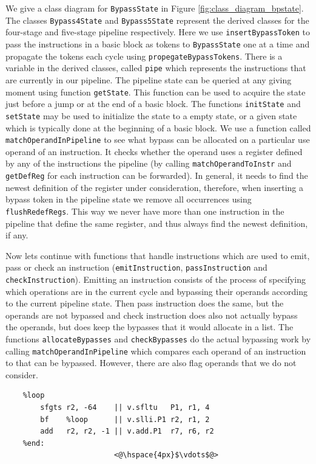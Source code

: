 We give a class diagram for \texttt{BypassState} in Figure \ref{fig:class_diagram_bpstate}. The classes  \texttt{Bypass4State} and \texttt{Bypass5State} represent the derived classes for the four-stage and five-stage pipeline respectively. Here we use \texttt{insertBypassToken} to pass the instructions in a basic block as tokens to \texttt{BypassState} one at a time and propagate the tokens each cycle using \texttt{propegateBypassTokens}. There is a variable in the derived classes, called \texttt{pipe} which represents the instructions that are currently in our pipeline. The pipeline state can be queried at any giving moment using function \texttt{getState}. This function can be used to acquire the state just before a jump or at the end of a basic block. The functions \texttt{initState} and \texttt{setState} may be used to initialize the state to a empty state, or a given state which is typically done at the beginning of a basic block. We use a function called \texttt{matchOperandInPipeline} to see what bypass can be allocated on a particular use operand of an instruction. It checks whether the operand uses a register defined by any of the instructions the pipeline (by calling \texttt{matchOperandToInstr} and \texttt{getDefReg} for each instruction can be forwarded). In general, it needs to find the newest definition of the register under consideration, therefore, when inserting a bypass token in the pipeline state we remove all occurrences using \texttt{flushRedefRegs}. This way we never have more than one instruction in the pipeline that define the same register, and thus always find the newest definition, if any.

Now lets continue with functions that handle instructions which are used to emit, pass or check an instruction (\texttt{emitInstruction}, \texttt{passInstruction} and \texttt{checkInstruction}). Emitting an instruction consists of the process of specifying which operations are in the current cycle and bypassing their operands according to the current pipeline state. Then pass instruction does the same, but the operands are not bypassed and check instruction does also not actually bypass the operands, but does keep the bypasses that it would allocate in a list. The functions \texttt{allocateBypasses} and \texttt{checkBypasses} do the actual bypassing work by calling \texttt{matchOperandInPipeline} which compares each operand of an instruction to  that can be bypassed. However, there are also flag operands that we do not consider. 
\begin{lstlisting}
    %loop
        sfgts r2, -64    || v.sfltu   P1, r1, 4
        bf    %loop      || v.slli.P1 r2, r1, 2
        add   r2, r2, -1 || v.add.P1  r7, r6, r2 
    %end:
                         <@\hspace{4px}$\vdots$@>
\end{lstlisting}

